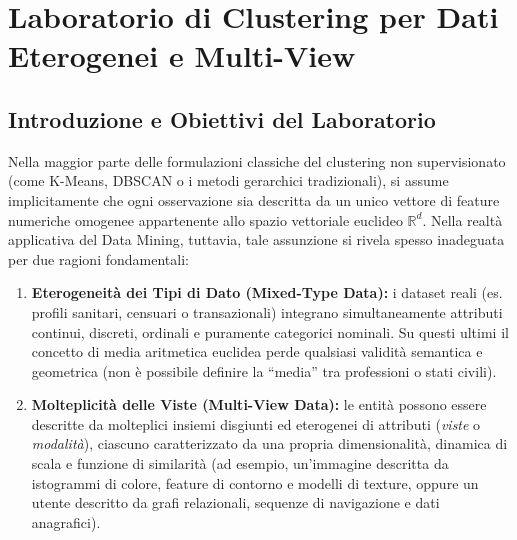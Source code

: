 \FloatBarrier
\section{Laboratorio di Clustering per Dati Eterogenei e Multi-View}
\label{chap:lab-clustering-heterogeneous-multiview}

\FloatBarrier
\subsection{Introduzione e Obiettivi del Laboratorio}
\label{sec:lab-het-mv-intro}

Nella maggior parte delle formulazioni classiche del clustering non supervisionato (come K-Means, DBSCAN o i metodi gerarchici tradizionali), si assume implicitamente che ogni osservazione sia descritta da un unico vettore di feature numeriche omogenee appartenente allo spazio vettoriale euclideo $\mathbb{R}^d$. Nella realtà applicativa del Data Mining, tuttavia, tale assunzione si rivela spesso inadeguata per due ragioni fondamentali:
\begin{enumerate}
    \item \textbf{Eterogeneità dei Tipi di Dato (Mixed-Type Data):} i dataset reali (es. profili sanitari, censuari o transazionali) integrano simultaneamente attributi continui, discreti, ordinali e puramente categorici nominali. Su questi ultimi il concetto di media aritmetica euclidea perde qualsiasi validità semantica e geometrica (non è possibile definire la ``media'' tra professioni o stati civili).
    \item \textbf{Molteplicità delle Viste (Multi-View Data):} le entità possono essere descritte da molteplici insiemi disgiunti ed eterogenei di attributi (\textit{viste} o \textit{modalità}), ciascuno caratterizzato da una propria dimensionalità, dinamica di scala e funzione di similarità (ad esempio, un'immagine descritta da istogrammi di colore, feature di contorno e modelli di texture, oppure un utente descritto da grafi relazionali, sequenze di navigazione e dati anagrafici).
\end{enumerate}

